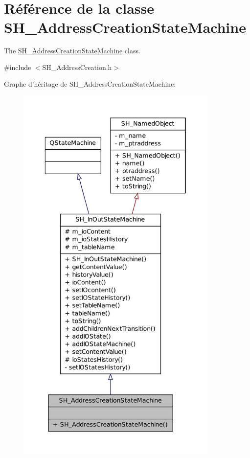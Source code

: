 \hypertarget{classSH__AddressCreationStateMachine}{\section{Référence de la classe S\-H\-\_\-\-Address\-Creation\-State\-Machine}
\label{classSH__AddressCreationStateMachine}
}


The \hyperlink{classSH__AddressCreationStateMachine}{S\-H\-\_\-\-Address\-Creation\-State\-Machine} class.  




{\ttfamily \#include $<$S\-H\-\_\-\-Address\-Creation.\-h$>$}



Graphe d'héritage de S\-H\-\_\-\-Address\-Creation\-State\-Machine\-:\nopagebreak
\begin{figure}[H]
\begin{center}
\leavevmode
\includegraphics[height=550pt]{classSH__AddressCreationStateMachine__inherit__graph}
\end{center}
\end{figure}


